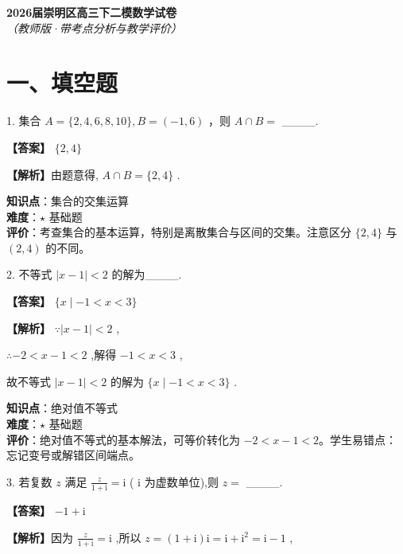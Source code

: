 \documentclass[10pt]{article}
\begin{document}
\begin{center}
\Large\textbf{2026届崇明区高三下二模数学试卷}\\[0.5em]
\normalsize\textit{（教师版·带考点分析与教学评价）}
\end{center}

\section*{一、填空题}

1. 集合 \(A = \{ 2,4,6,8,{10}\} ,B = \left( {-1,6}\right)\) ，则 \(A \cap  B =\) \_\_\_\_.

\textbf{【答案】} \(\{ 2,4\}\)

\textbf{【解析】}由题意得, \(A \cap  B = \{ 2,4\}\) .

\begin{analysisbox}[考点分析]
\textbf{知识点}：集合的交集运算\\
\textbf{难度}：\(\star\) 基础题\\
\textbf{评价}：考查集合的基本运算，特别是离散集合与区间的交集。注意区分 \(\{2,4\}\) 与 \((2,4)\) 的不同。
\end{analysisbox}

2. 不等式 \(\left| {x - 1}\right|  < 2\) 的解为\_\_\_\_.

\textbf{【答案】} \(\{ x \mid   - 1 < x < 3\}\)

\textbf{【解析】} \(\because \left| {x - 1}\right|  < 2\) ,

\(\therefore  - 2 < x - 1 < 2\) ,解得 \(- 1 < x < 3\) ,

故不等式 \(\left| {x - 1}\right|  < 2\) 的解为 \(\{ x \mid   - 1 < x < 3\}\) .

\begin{analysisbox}[考点分析]
\textbf{知识点}：绝对值不等式\\
\textbf{难度}：\(\star\) 基础题\\
\textbf{评价}：绝对值不等式的基本解法，可等价转化为 \(-2 < x-1 < 2\)。学生易错点：忘记变号或解错区间端点。
\end{analysisbox}

3. 若复数 \(z\) 满足 \(\frac{z}{1 + \mathrm{i}} = \mathrm{i}\) ( \(\mathrm{i}\) 为虚数单位),则 \(z =\) \_\_\_\_.

\textbf{【答案】} \(- 1 + \mathrm{i}\)

\textbf{【解析】}因为 \(\frac{z}{1 + \mathrm{i}} = \mathrm{i}\) ,所以 \(z = \left( {1 + \mathrm{i}}\right) \mathrm{i} = \mathrm{i} + {\mathrm{i}}^{2} = \mathrm{i} - 1\) ,
\end{document}
